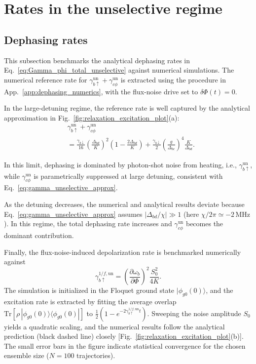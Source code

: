 \section{Rates in the unselective regime}
\label{app:dephasing_unselective}
\subsection{Dephasing rates}
This subsection benchmarks the analytical dephasing rates in Eq.~\eqref{eq:Gamma_phi_total_unselective} against numerical simulations. The numerical reference rate for
\(\gamma_{b\uparrow}^{\mathrm{un}}+\gamma_{c\phi}^{\mathrm{un}}\) is extracted using the procedure in App.~\ref{app:dephasing_numerics}, with the flux-noise drive set to \(\delta\Phi(t)=0\).

In the large-detuning regime, the reference rate is well captured by the analytical approximation in Fig.~\ref{fig:relaxation_excitation_plot}(a):
\begin{align}
&\gamma_{b\uparrow}^{\mathrm{un}}+\gamma_{c\phi}^{\mathrm{un}}\\
&=
\frac{\gamma_{b\downarrow}}{16}\left(\frac{\Delta_{bd}}{K}\right)^2
\left(1-\frac{2\Delta_{bd}}{K}\right)
+\frac{\gamma_{b\downarrow}}{2}\left(\frac{g}{\Delta_{bc}}\right)^4\frac{K}{\Delta_{bd}} .
\label{eq:gamma_unselective_approx}
\end{align}

In this limit, dephasing is dominated by photon-shot noise from heating, i.e., \(\gamma_{b\uparrow}^{\mathrm{un}}\), while \(\gamma_{c\phi}^{\mathrm{un}}\) is parametrically suppressed at large detuning, consistent with Eq.~\eqref{eq:gamma_unselective_approx}.

As the detuning decreases, the numerical and analytical results deviate because Eq.~\eqref{eq:gamma_unselective_approx} assumes \(|\Delta_{bd}/\chi|\gg 1\) (here \(\chi/2\pi \simeq -2\,\mathrm{MHz}\)). In this regime, the total dephasing rate increases and \(\gamma_{c\phi}^{\mathrm{un}}\) becomes the dominant contribution.

Finally, the flux-noise-induced depolarization rate is benchmarked numerically against
\begin{equation}
\gamma_{b\uparrow}^{1/f,\mathrm{un}}=
\left(\frac{\partial\omega_b}{\partial\Phi}\right)^2\frac{S_0^2}{4K}.
\end{equation}
The simulation is initialized in the Floquet ground state \(|\phi_{g0}(0)\rangle\), and the excitation rate is extracted by fitting the average overlap
\(\mathrm{Tr}\!\left[\rho\,|\phi_{g0}(0)\rangle\langle\phi_{g0}(0)|\right]\) to \(\frac{1}{2}\!\left(1-e^{-2\gamma_{b\uparrow}^{1/f,\mathrm{un}} t}\right)\).
Sweeping the noise amplitude \(S_0\) yields a quadratic scaling, and the numerical results follow the analytical prediction (black dashed line) closely [Fig.~\ref{fig:relaxation_excitation_plot}(b)]. The small error bars in the figure indicate statistical convergence for the chosen ensemble size ($N=100$ trajectories).

